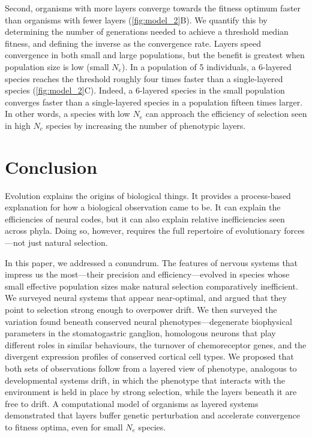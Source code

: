 \documentclass[twocolumn]{article}
\begin{document}
Second, organisms with more layers converge towards the fitness optimum faster than organisms with fewer layers (\autoref{fig:model_2}B). We quantify this by determining the number of generations needed to achieve a threshold median fitness, and defining the inverse as the convergence rate. Layers speed convergence in both small and large populations, but the benefit is greatest when population size is low (small $N_e$). In a population of 5 individuals, a 6-layered species reaches the threshold roughly four times faster than a single-layered species (\autoref{fig:model_2}C). Indeed, a 6-layered species in the small population converges faster than a single-layered species in a population fifteen times larger. In other words, a species with low $N_e$ can approach the efficiency of selection seen in high $N_e$ species by increasing the number of phenotypic layers.


\section{Conclusion}

Evolution explains the origins of biological things. It provides a process-based explanation for how a biological observation came to be. It can explain the efficiencies of neural codes, but it can also explain relative inefficiencies seen across phyla. Doing so, however, requires the full repertoire of evolutionary forces---not just natural selection.

In this paper, we addressed a conundrum. The features of nervous systems that impress us the most---their precision and efficiency---evolved in species whose small effective population sizes make natural selection comparatively inefficient. We surveyed neural systems that appear near-optimal, and argued that they point to selection strong enough to overpower drift. We then surveyed the variation found beneath conserved neural phenotypes---degenerate biophysical parameters in the stomatogastric ganglion, homologous neurons that play different roles in similar behaviours, the turnover of chemoreceptor genes, and the divergent expression profiles of conserved cortical cell types. We proposed that both sets of observations follow from a layered view of phenotype, analogous to developmental systems drift, in which the phenotype that interacts with the environment is held in place by strong selection, while the layers beneath it are free to drift. A computational model of organisms as layered systems demonstrated that layers buffer genetic perturbation and accelerate convergence to fitness optima, even for small $N_e$ species.
\end{document}
